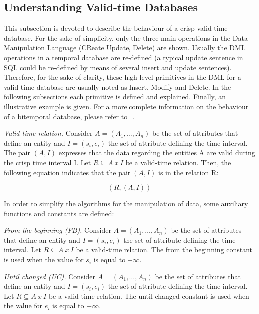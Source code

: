 \subsection{\label{subsubsec:Understanding-valid-time-databases}Understanding Valid-time Databases}
This subsection is devoted to describe the behaviour of a crisp valid-time database. For the sake of simplicity, only the three main operations in the Data Manipulation Language (CReate Update, Delete) are shown. Usually the DML operations in a temporal database are re-defined (a typical update sentence in SQL could be re-defined by means of several insert and update sentences). Therefore, for the sake of clarity, these high level primitives in the DML for a valid-time database are usually noted as Insert, Modify and Delete. In the following subsections each primitive is defined and explained. Finally, an illustrative example is given. For a more complete information on the behaviour of a bitemporal database, please refer to ~\cite{Jensen1994}.

\begin{definition}
\emph{Valid-time relation.}
Consider $A=\left(A_1, \ldots, A_n \right)$ be the set of attributes that define an entity and $I = \left(s_i,e_i \right)$ the set of attribute defining the time interval.  The pair $\left(A, I\right)$ expresses that the data regarding the entities A are valid during the crisp time interval I. Let $R \subseteq A\  x\  I$ be a valid-time relation. Then, the following equation indicates that the pair $\left(A, I\right)$ is in the relation R:

\begin{equation}
\label{eq:rel-def}
\left( R, \left(A , I\right) \right)
\end{equation}
\end{definition}

In order to simplify the algorithms for the manipulation of data, some auxiliary functions and constants are defined:


\begin{definition}
 \label{def:from-beginning}
\emph{From the beginning (FB).} 
Consider $A=\left(A_1, \ldots, A_n \right)$ be the set of attributes that define an entity and $I = \left(s_i,e_i \right)$ the set of attribute defining the time interval. Let $R \subseteq A\  x\  I$ be a valid-time relation. The from the beginning constant is used when the value for $s_i$ is equal to $-\infty$.
\end{definition}

\begin{definition}
 \label{def:until-changed}
\emph{Until changed (UC).} 
Consider $A=\left(A_1, \ldots, A_n \right)$ be the set of attributes that define an entity and $I = \left(s_i,e_i \right)$ the set of attribute defining the time interval. Let $R \subseteq A\  x\  I$ be a valid-time relation. The until changed constant is used when the value for $e_i$ is equal to $+\infty$.
\end{definition}

